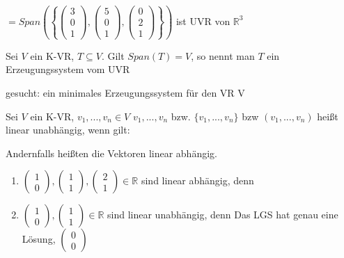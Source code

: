 \documentclass{../tudscript}
\begin{document}
\(= Span\left(\left\{\begin{pmatrix}3\\0\\1\end{pmatrix},\begin{pmatrix}5\\0\\1\end{pmatrix},\begin{pmatrix}0\\2\\1\end{pmatrix}  \right\}\right)\)
ist UVR von \(\mathbb{R}^3\)

\hypertarget{definition}{%
\label{definition}}

Sei \(V\) ein K-VR, \(T \subseteq V\). Gilt \(Span(T) = V\), so nennt
man \(T\) ein Erzeugungssystem vom UVR

\hypertarget{beispiel-1}{%
\label{beispiel-1}}

gesucht: ein minimales Erzeugungssystem für den VR V

\hypertarget{definition-1}{%
\label{definition-1}}

Sei \(V\) ein K-VR, \(v_1, ..., v_n \in V\) \(v_1, ..., v_n\) bzw.
\(\{v_1, ..., v_n\}\) bzw \((v_1, ..., v_n)\) heißt linear unabhängig,
wenn gilt:

Andernfalls heißten die Vektoren linear abhängig.

\hypertarget{beispiel-2}{%
\label{beispiel-2}}

\begin{enumerate}
\def\labelenumi{\arabic{enumi}.}
\item
  \(\begin{pmatrix}1\\0\end{pmatrix}, \begin{pmatrix}1\\1\end{pmatrix}, \begin{pmatrix}2\\1\end{pmatrix} \in \mathbb{R}\)
  sind linear abhängig, denn 
\item
  \(\begin{pmatrix}1\\0\end{pmatrix}, \begin{pmatrix}1\\1\end{pmatrix} \in \mathbb{R}\)
  sind linear unabhängig, denn Das LGS hat genau eine Lösung,
  \(\begin{pmatrix}0\\0\end{pmatrix}\)
\end{enumerate}
\end{document}
